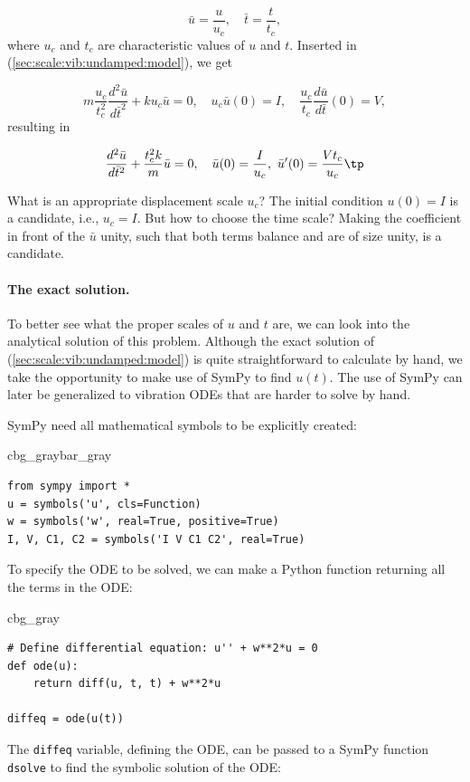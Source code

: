 \documentclass[graybox,envcountchap,sectrefs,final]{svmonodo}
\newenvironment{_cod_tight}[1]{
   \def\FrameCommand{\colorbox{#1}}
   \FrameRule0.6pt\MakeFramed {\FrameRestore}\vskip3mm}
   {\vskip0mm\endMakeFramed}
\newenvironment{cod}[1]{
\bgroup\rmfamily
\fboxsep=0mm\relax
\begin{_cod_tight}{#1}
\list{}{\parsep=-2mm\parskip=0mm\topsep=0pt\leftmargin=2mm
\rightmargin=2\leftmargin\leftmargin=4pt\relax}
\item\relax}
{\endlist\end{_cod_tight}\egroup}
\newenvironment{_pro_tight}[2]{
   \def\FrameCommand{\color{#2}\vrule width 1mm\normalcolor\colorbox{#1}}
   \FrameRule0.6pt\MakeFramed {\advance\hsize-2mm\FrameRestore}\vskip3mm}
   {\vskip0mm\endMakeFramed}
\newenvironment{pro}[2]{
\bgroup\rmfamily
\fboxsep=0mm\relax
\begin{_pro_tight}{#1}{#2}
\list{}{\parsep=-2mm\parskip=0mm\topsep=0pt\leftmargin=2mm
\rightmargin=2\leftmargin\leftmargin=4pt\relax}
\item\relax}
{\endlist\end{_pro_tight}\egroup}
\begin{document}
\[ \bar u =\frac{u}{u_c},\quad\bar t = \frac{t}{t_c},\]
where $u_c$ and $t_c$ are characteristic values of $u$ and $t$.
Inserted in (\ref{sec:scale:vib:undamped:model}), we get

\[ m\frac{u_c}{t_c^2}\frac{d^2\bar u}{d\bar t^2} + ku_c\bar u = 0,
\quad u_c\bar u(0)=I,\quad \frac{u_c}{t_c}\frac{d\bar u}{d\bar t}(0)=V,\]
resulting in

\begin{equation}
\frac{d^2\bar u}{d\bar t^2} + \frac{t_c^2 k}{m}\bar u = 0,
\quad \bar u(0)=\frac{I}{u_c},\ \bar u'(0)=\frac{Vt_c}{u_c}\tp
\label{sec:scale:vib:undamped:model:scaled0}
\end{equation}

What is an appropriate displacement scale $u_c$? The initial condition
$u(0)=I$ is a candidate, i.e., $u_c=I$. But how to choose the time scale?
Making the coefficient in front of the $\bar u$ unity, such that
both terms balance and are of size unity, is a candidate.

\paragraph{The exact solution.}
To better see what the proper scales of $u$ and $t$ are, we can look
into the analytical solution of this problem.
Although the exact solution of
(\ref{sec:scale:vib:undamped:model}) is quite straightforward to calculate
by hand, we take the opportunity to make use of SymPy to
find $u(t)$. The use of SymPy can later be generalized to vibration
ODEs that are harder to solve by hand.

SymPy need all mathematical symbols to be explicitly created:

\begin{pro}{cbg_gray}{bar_gray}\begin{Verbatim}[numbers=none,fontsize=\fontsize{9pt}{9pt},baselinestretch=0.95,xleftmargin=2mm]
from sympy import *
u = symbols('u', cls=Function)
w = symbols('w', real=True, positive=True)
I, V, C1, C2 = symbols('I V C1 C2', real=True)
\end{Verbatim}
\end{pro}
\noindent
To specify the ODE to be solved, we can make a Python function returning
all the terms in the ODE:

\begin{cod}{cbg_gray}\begin{Verbatim}[numbers=none,fontsize=\fontsize{9pt}{9pt},baselinestretch=0.95,xleftmargin=2mm]
# Define differential equation: u'' + w**2*u = 0
def ode(u):
    return diff(u, t, t) + w**2*u

diffeq = ode(u(t))
\end{Verbatim}
\end{cod}
\noindent
The \texttt{diffeq} variable, defining the ODE, can be passed to a SymPy
function \texttt{dsolve} to find the symbolic solution of the ODE:
\end{document}
